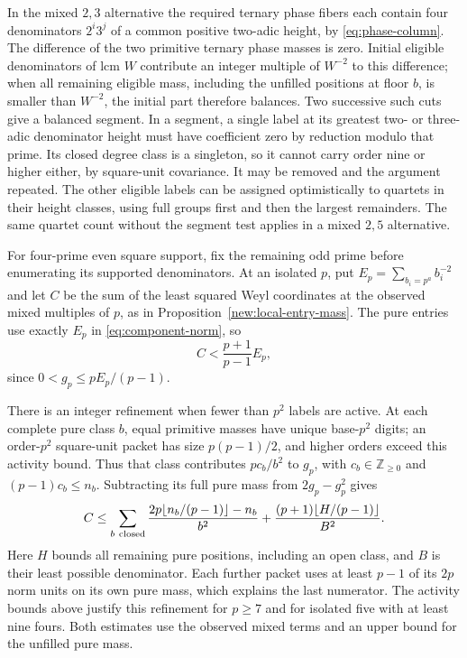 \documentclass[11pt]{amsart}
\numberwithin{equation}{section}
\theoremstyle{definition}
\theoremstyle{plain}
\newcommand{\ZZ}{\mathbb Z}
\begin{document}
In the mixed $2,3$ alternative the required ternary phase fibers
each contain four denominators $2^i3^j$ of a common positive
two-adic height, by \eqref{eq:phase-column}. The difference of
the two primitive ternary phase masses is zero. Initial eligible
denominators of lcm $W$ contribute an integer multiple of $W^{-2}$
to this difference; when all remaining eligible mass, including the
unfilled positions at floor $b$, is smaller than $W^{-2}$, the
initial part therefore balances. Two successive such cuts give a
balanced segment. In a segment, a single label at its greatest
two- or three-adic denominator height must have coefficient zero
by reduction modulo that prime. Its closed degree class is a
singleton, so it cannot carry order nine or higher either, by
square-unit covariance. It may be removed and the argument repeated.
The other eligible labels can be assigned optimistically to quartets
in their height classes, using full groups first and then the
largest remainders. The same quartet count without the segment
test applies in a mixed $2,5$ alternative.

For four-prime even square support, fix the remaining odd prime
before enumerating its supported denominators. At an isolated $p$,
put $E_p=\sum_{b_i=p^a}b_i^{-2}$ and let $C$ be the sum of the
least squared Weyl coordinates at the observed mixed multiples of
$p$, as in Proposition~\ref{new:local-entry-mass}. The pure entries
use exactly $E_p$ in \eqref{eq:component-norm}, so
\begin{equation}\label{eq:prefix-component-cost}
 C<\frac{p+1}{p-1}E_p,
\end{equation}
since $0<g_p\le pE_p/(p-1)$.

There is an integer refinement when fewer than $p^2$ labels are
active. At each complete pure class $b$, equal primitive masses
have unique base-$p^2$ digits; an order-$p^2$ square-unit packet
has size $p(p-1)/2$, and higher orders exceed this activity bound.
Thus that class contributes $pc_b/b^2$ to $g_p$, with
$c_b\in\ZZ_{\ge0}$ and $(p-1)c_b\le n_b$. Subtracting its full
pure mass from $2g_p-g_p^2$ gives
\begin{equation}\label{eq:prefix-closed-component-cost}
 C\le\sum_{b\ {\rm closed}}
       \frac{2p\lfloor n_b/(p-1)\rfloor-n_b}{b^2}
       +\frac{(p+1)\lfloor H/(p-1)\rfloor}{B^2}.
\end{equation}
Here $H$ bounds all remaining pure positions, including an open
class, and $B$ is their least possible denominator. Each further
packet uses at least $p-1$ of its $2p$ norm units on its own pure
mass, which explains the last numerator. The activity bounds above
justify this refinement for $p\ge7$ and for isolated five with at
least nine fours. Both estimates use the observed mixed terms and
an upper bound for the unfilled pure mass.
\end{document}
